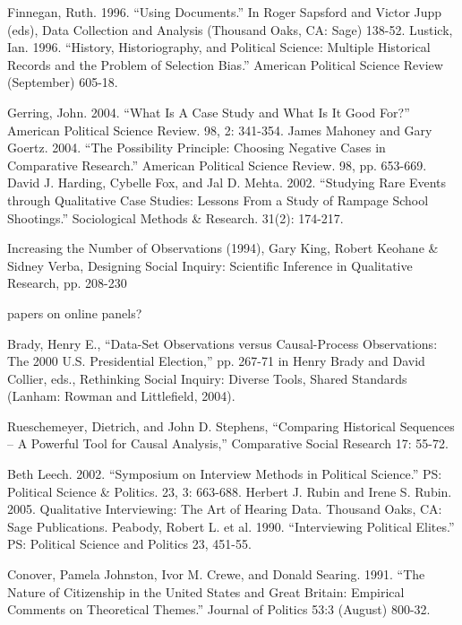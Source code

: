 \documentclass[12pt,a4paper]{article}
\begin{document}
Finnegan, Ruth. 1996. “Using Documents.” In Roger Sapsford and Victor Jupp (eds), Data Collection and Analysis (Thousand Oaks, CA: Sage) 138-52.
Lustick, Ian. 1996. “History, Historiography, and Political Science: Multiple Historical Records and the Problem of Selection Bias.” American Political Science Review (September) 605-18.




Gerring, John. 2004. “What Is A Case Study and What Is It Good For?” American Political Science Review. 98, 2: 341-354.
James Mahoney and Gary Goertz. 2004. “The Possibility Principle: Choosing Negative Cases in Comparative Research.” American Political Science Review. 98, pp. 653-669.
David J. Harding, Cybelle Fox, and Jal D. Mehta. 2002. “Studying Rare Events through Qualitative Case Studies: Lessons From a Study of Rampage School Shootings.” Sociological Methods & Research. 31(2): 174-217.

Increasing the Number of Observations (1994), Gary King, Robert Keohane & Sidney Verba, Designing Social Inquiry: Scientific Inference in Qualitative Research, pp. 208-230

papers on online panels?


Brady, Henry E., “Data-Set Observations versus Causal-Process Observations: The 2000 U.S. Presidential Election,” pp. 267-71 in Henry Brady and David Collier, eds., Rethinking Social Inquiry: Diverse Tools, Shared Standards (Lanham: Rowman and Littlefield, 2004).

Rueschemeyer, Dietrich, and John D. Stephens, “Comparing Historical Sequences – A Powerful Tool for Causal Analysis,” Comparative Social Research 17: 55-72.


Beth Leech. 2002. “Symposium on Interview Methods in Political Science.” PS: Political Science & Politics. 23, 3: 663-688.
Herbert J. Rubin and Irene S. Rubin. 2005. Qualitative Interviewing: The Art of Hearing Data. Thousand Oaks, CA: Sage Publications.
Peabody, Robert L. et al. 1990. “Interviewing Political Elites.” PS: Political Science and Politics 23, 451-55.

Conover, Pamela Johnston, Ivor M. Crewe, and Donald Searing. 1991. “The Nature of Citizenship in the United States and Great Britain: Empirical Comments on Theoretical Themes.” Journal of Politics 53:3 (August) 800-32.
\end{document}
